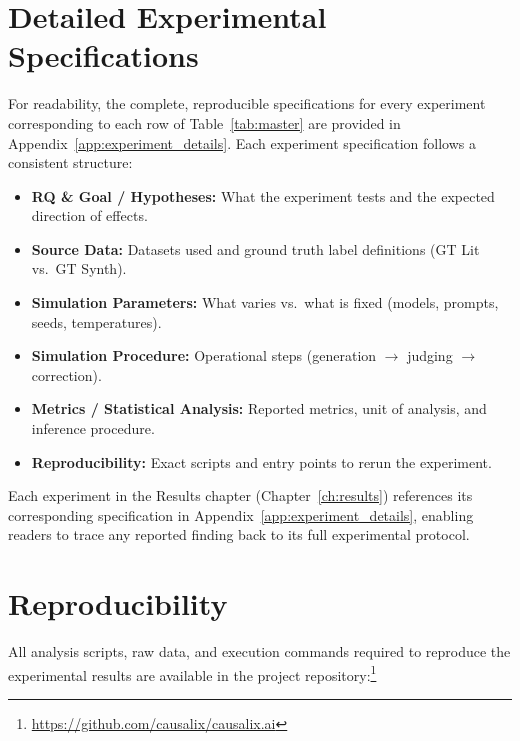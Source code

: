\section{Detailed Experimental Specifications}
\label{sec:experimental_details_ref}

For readability, the complete, reproducible specifications for every experiment corresponding to each row of Table~\ref{tab:master} are provided in Appendix~\ref{app:experiment_details}. Each experiment specification follows a consistent structure:
\begin{itemize}[noitemsep]
    \item \textbf{RQ \& Goal / Hypotheses:} What the experiment tests and the expected direction of effects.
    \item \textbf{Source Data:} Datasets used and ground truth label definitions (GT Lit vs.\ GT Synth).
    \item \textbf{Simulation Parameters:} What varies vs.\ what is fixed (models, prompts, seeds, temperatures).
    \item \textbf{Simulation Procedure:} Operational steps (generation $\rightarrow$ judging $\rightarrow$ correction).
    \item \textbf{Metrics / Statistical Analysis:} Reported metrics, unit of analysis, and inference procedure.
    \item \textbf{Reproducibility:} Exact scripts and entry points to rerun the experiment.
\end{itemize}
Each experiment in the Results chapter (Chapter~\ref{ch:results}) references its corresponding specification in Appendix~\ref{app:experiment_details}, enabling readers to trace any reported finding back to its full experimental protocol.

\section{Reproducibility}
\label{sec:reproduction}

All analysis scripts, raw data, and execution commands required to reproduce the experimental results are available in the project repository:\footnote{\url{https://github.com/causalix/causalix.ai}}

